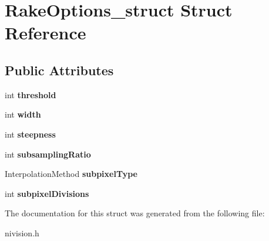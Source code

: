\hypertarget{structRakeOptions__struct}{
\section{RakeOptions\_\-struct Struct Reference}
\label{structRakeOptions__struct}
}
\subsection*{Public Attributes}
\begin{DoxyCompactItemize}
\item 
\hypertarget{structRakeOptions__struct_ad749b2891d993a6b83c65fddc29d1a85}{
int {\bfseries threshold}}
\label{structRakeOptions__struct_ad749b2891d993a6b83c65fddc29d1a85}

\item 
\hypertarget{structRakeOptions__struct_a0d4aaa615112b780d7a5b0d3a82b419e}{
int {\bfseries width}}
\label{structRakeOptions__struct_a0d4aaa615112b780d7a5b0d3a82b419e}

\item 
\hypertarget{structRakeOptions__struct_a8bd558064939ff00372b0d9d2b530646}{
int {\bfseries steepness}}
\label{structRakeOptions__struct_a8bd558064939ff00372b0d9d2b530646}

\item 
\hypertarget{structRakeOptions__struct_adffcffc68e3c06d8e3c22af2548d7a85}{
int {\bfseries subsamplingRatio}}
\label{structRakeOptions__struct_adffcffc68e3c06d8e3c22af2548d7a85}

\item 
\hypertarget{structRakeOptions__struct_aff9c8f09658e80b207c42093ea8e412e}{
InterpolationMethod {\bfseries subpixelType}}
\label{structRakeOptions__struct_aff9c8f09658e80b207c42093ea8e412e}

\item 
\hypertarget{structRakeOptions__struct_a5e4a9de11e856a4715707077bc022010}{
int {\bfseries subpixelDivisions}}
\label{structRakeOptions__struct_a5e4a9de11e856a4715707077bc022010}

\end{DoxyCompactItemize}


The documentation for this struct was generated from the following file:\begin{DoxyCompactItemize}
\item 
nivision.h\end{DoxyCompactItemize}
